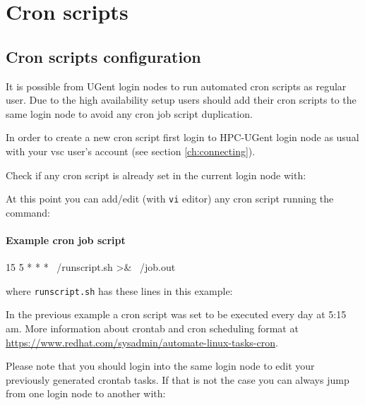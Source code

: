 \chapter{Cron scripts}
\label{ch:crontab_ugent}


\section{Cron scripts configuration}
\label{sec:crontab_ugent_cron_scripts}
It is possible from UGent login nodes to run automated cron scripts as
regular user. Due to the high availability setup users should add their
cron scripts to the same login node to avoid any cron job script duplication.

In order to create a new cron script first login to HPC-UGent login node as
usual with your vsc user's account (see section \autoref{ch:connecting}).

Check if any cron script is already set in the current login node with:


\begin{prompt}
\end{prompt}

At this point you can add/edit (with \lstinline|vi| editor) any cron script running the command:

\begin{prompt}
\end{prompt}

\subsubsection{Example cron job script}
\label{sec:crontab_ugent_cron_script_example}
\begin{prompt}
 15 5 * * * ~/runscript.sh >& ~/job.out
\end{prompt}

where \lstinline|runscript.sh| has these lines in this example:


In the previous example a cron script was set to be executed every day at 5:15 am.
More information about crontab and cron scheduling format at 
\url{https://www.redhat.com/sysadmin/automate-linux-tasks-cron}.

Please note that you should login into the same login node to edit your previously 
generated crontab tasks. If that is not the case you can always jump from one login node
to another with:

\begin{prompt}
\end{prompt}




